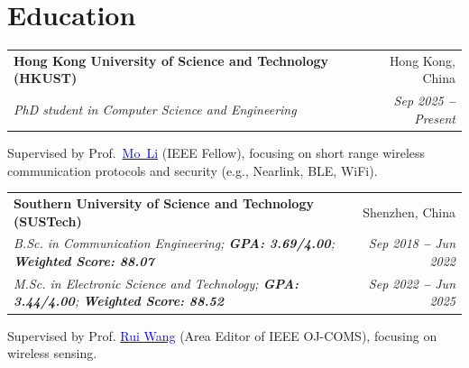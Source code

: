 \documentclass[letterpaper,10pt]{article}
\makeatletter
\newcommand{\resumeSubheading}[4]{
  \vspace{-2pt}\item
    \begin{tabular*}{0.97\textwidth}[t]{l@{\extracolsep{\fill}}r}
      \textbf{#1} & #2 \\
      \textit{\small#3} & \textit{\small #4} \\
    \end{tabular*}\vspace{-7pt}
}
\newcommand{\resumeEducationHeading}[6]{
  \vspace{-2pt}\item
    \begin{tabular*}{0.97\textwidth}[t]{l@{\extracolsep{\fill}}r}
      \textbf{#1} & #2 \\
      \textit{\small#3} & \textit{\small #4} \\
      \textit{\small#5} & \textit{\small #6} \\
    \end{tabular*}\vspace{-5pt}
}
\newcommand{\resumeSubHeadingListStart}{\begin{itemize}[leftmargin=0.15in, label={}]}
\newcommand{\resumeSubHeadingListEnd}{\end{itemize}\vspace{-5pt}}
\makeatother
\begin{document}
\section{Education}
  \vspace{3pt}
  \resumeSubHeadingListStart
      \resumeSubheading
      {Hong Kong University of Science and Technology (HKUST)}{Hong Kong, China}
      {PhD student in Computer Science and Engineering}{Sep 2025 \textbf{--} Present}
    \resumeSubHeadingListStart
        \small{\item{Supervised by Prof.~\href{https://home.cse.ust.hk/~lim/}{\textcolor{blue}{Mo~Li}} (IEEE Fellow), focusing on short range wireless communication protocols and security (e.g., Nearlink, BLE, WiFi).}}
    \resumeSubHeadingListEnd 
    \resumeEducationHeading
      {Southern University of Science and Technology (SUSTech)
      }{Shenzhen, China}
      {B.Sc. in Communication Engineering;   \textbf{GPA: 3.69/4.00}; \textbf{Weighted Score: 88.07}}{Sep 2018 \textbf{--} Jun 2022}
      {M.Sc. in Electronic Science and Technology;
      \textbf{GPA: 3.44/4.00}; \textbf{Weighted Score: 88.52} }{Sep 2022 \textbf{--} Jun 2025}
        \resumeSubHeadingListStart
        \small{\item{Supervised by Prof. \href{https://ieeexplore.ieee.org/author/37089502484}{\textcolor{blue}{Rui Wang}} (Area Editor of IEEE OJ-COMS), focusing on wireless sensing. \\ \vspace{3pt}
        }}
        \resumeSubHeadingListEnd    
  \resumeSubHeadingListEnd

\end{document}
